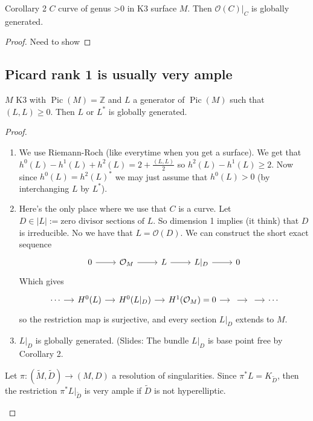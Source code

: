 \begin{thing6}{Corollary 2}\leavevmode
$C$ curve of genus >0 in K3 surface $M$. Then $\mathcal{O}(C)|_{C}$ is globally generated.
\end{thing6}

\begin{proof}\leavevmode
	Need to show 
\end{proof}

\subsection{Picard rank 1 is usually very ample}

\begin{thm}\leavevmode
	$M$ K3 with $\operatorname{Pic}(M) =\mathbb{Z}$ and $L$ a generator of $\operatorname{Pic}(M)$ such that $(L,L)\geq 0$. Then $L$ or $L^*$ is globally generated.
\end{thm}

\begin{proof}\leavevmode
	\begin{enumerate}[label=\textbf{Step \arabic*}]
		\item We use Riemann-Roch (like everytime when you get a surface). We get that $h^{0}(L)-h^{1}(L)+h^{2}(L)=2+\frac{(L,L)}{2}$ so $h^{2}(L)-h^{1}(L)\geq 2$. Now since $h^{0}(L)=h^{2}(L)^*$ we may just assume that $h^{0}(L)>0$ (by interchanging $L$ by $L^*$).

		\item Here's the only place where we use that $C$ is a curve. Let $D\in |L|:=\text{zero divisor sections of $L$} $. So dimension 1 implies (it think) that $D$ is irreducible. No we have that $L=\mathcal{O}(D)$. We can construct the short exact sequence
			\[\begin{tikzcd}
				0\arrow[r]&\mathcal{O}_M\arrow[r]&L\arrow[r]&L|_{D}\arrow[r]&0
			\end{tikzcd}\]
			Which gives
			\[\begin{tikzcd}[column sep=small]
				\cdots\arrow[r]&H^{0}(L)\arrow[r]&H^{0}(L|_{D})\arrow[r]&H^{1}(\mathcal{O}_M)=0\arrow[r]&\arrow[r]&\arrow[r]&\cdots
			\end{tikzcd}\]
			so the restriction map is surjective, and every section $L|_{D}$ extends to $M$.

		\item $L|_{D}$ is globally generated. ({\color{4}Slides:} The bundle $L|_{D}$ is base point free by Corollary 2.
	\end{enumerate}

	\begin{remark}\leavevmode
		Let $\pi:(\tilde{M},\tilde{D})\longrightarrow (M,D)$ a resolution of singularities. Since $\pi^* L=K_{\tilde{D}}$, then the restriction $\pi^* L |_{\tilde{D}}$ is very ample if $\tilde{D}$ is not hyperelliptic.
	\end{remark}
\end{proof}

